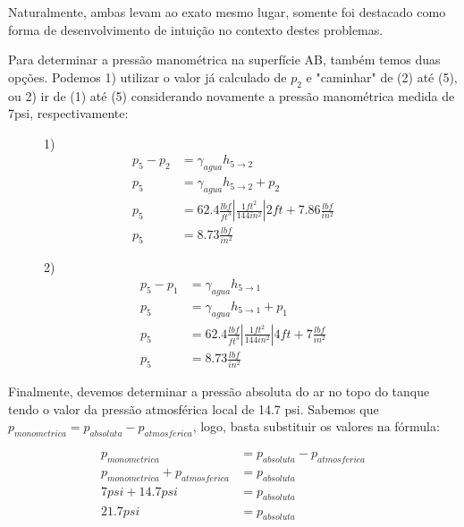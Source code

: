\documentclass{article}
\begin{document}
Naturalmente, ambas levam ao exato mesmo lugar, somente foi destacado como forma de desenvolvimento de intuição no contexto destes problemas.
 

Para determinar a pressão manométrica na superfície AB, também temos duas opções. Podemos 1) utilizar o valor já calculado de $p_2$ e "caminhar" de (2) até (5), ou 2) ir de (1) até (5) considerando novamente a pressão manométrica medida de 7psi, respectivamente:

\begin{figure}[!h]
\centering
\begin{minipage}{0.5\textwidth}
     1)
     \begin{align*}
          p_5-p_2&=\gamma_{agua}h_{5\rightarrow2}\\
          p_5&=\gamma_{agua}h_{5\rightarrow2}+p_2\\
          p_5&= 62.4\frac{lbf}{ft^3} \left|\frac{1ft^2}{144in^2} \right|2ft+7.86\frac{lbf}{in^2}\\
          p_5&=8.73\frac{lbf}{in^2}
     \end{align*}
\end{minipage}\hfill
\begin{minipage}{0.5\textwidth}
     2)
     \begin{align*}
          p_5-p_1&=\gamma_{agua}h_{5\rightarrow1}\\
          p_5&=\gamma_{agua}h_{5\rightarrow1}+p_1\\
          p_5&=62.4\frac{lbf}{ft^3}\left|\frac{1ft^2}{144in^2} \right|4ft+7\frac{lbf}{in^2}\\
          p_5&=8.73\frac{lbf}{in^2}
     \end{align*}
\end{minipage}
\end{figure}

Finalmente, devemos determinar a pressão absoluta do ar no topo do tanque tendo o valor da pressão atmosférica local de 14.7 psi. Sabemos que $p_{monometrica}=p_{absoluta}-p_{atmosferica}$, logo, basta substituir os valores na fórmula:

\begin{align*}
     p_{monometrica}&=p_{absoluta}-p_{atmosferica}\\
     p_{monometrica}+p_{atmosferica}&=p_{absoluta}\\
     7psi+14.7psi&=p_{absoluta}\\
     21.7psi&=p_{absoluta}\\
\end{align*}
\end{document}
